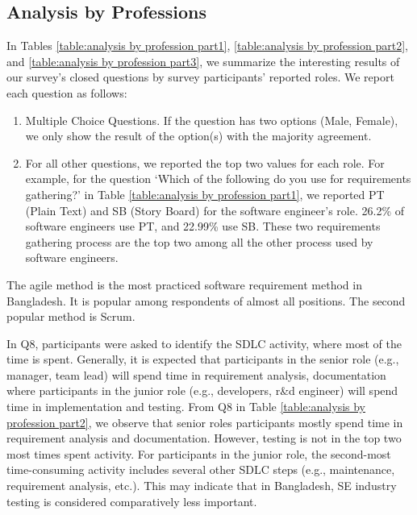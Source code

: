 \subsection{Analysis by Professions}
\label{analyze_by_professions}
In Tables \ref{table:analysis by profession part1}, \ref{table:analysis by profession part2}, and \ref{table:analysis by profession part3}, we summarize the interesting results of our survey's closed questions by survey participants' reported roles. We report each question as follows:

\begin{enumerate}[label=\arabic*)]
    \item Multiple Choice Questions. If the question has two options (Male, Female), we only show the result of the option(s) with the majority agreement.
    \item For all other questions, we reported the top two values for each role. For example, for the question ‘Which of the following do you use for requirements gathering?’ in Table \ref{table:analysis by profession part1}, we reported PT (Plain Text) and SB (Story Board) for the software engineer's role. 26.2\% of software engineers use PT, and 22.99\% use SB. These two requirements gathering process are the top two among all the other process used by software engineers.
\end{enumerate}




The agile method is the most practiced software requirement method in Bangladesh. It is popular among respondents of almost all positions. The second popular method is Scrum.

In Q8, participants were asked to identify the SDLC activity, where most of the time is spent. Generally, it is expected that participants in the senior role (e.g., manager, team lead) will spend time in requirement analysis, documentation where participants in the junior role (e.g., developers, r\&d engineer) will spend time in implementation and testing. From  Q8 in Table \ref{table:analysis by profession part2}, we observe that senior roles participants mostly spend time in requirement analysis and documentation. However, testing is not in the top two most times spent activity. For participants in the junior role, the second-most time-consuming activity includes several other SDLC steps (e.g., maintenance, requirement analysis, etc.). This may indicate that in Bangladesh, SE industry testing is considered comparatively less important.


